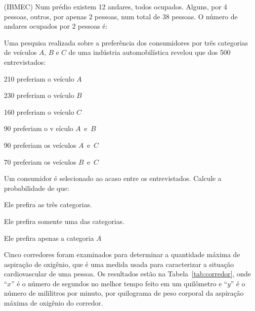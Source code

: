 \documentclass{ativmatUFRB}
\begin{document}
\begin{atividade}
\questao  (IBMEC) Num prédio existem 12 andares, todos ocupados. 
Alguns, por 4 pessoas, outros, por apenas 2 pessoas, num total de 38 pessoas. 
O número de andares ocupados por 2 pessoas é:


\questao Uma pesquisa realizada sobre a preferência dos consumidores por três 
categorias de veículos $A$, $B$ e $C$ de uma indústria automobilística revelou 
que dos 500 entrevistados:

\begin{multicols}{2}
 \begin{itens}[I)]
  \item 210 preferiam o veículo $A$
  \item 230 preferiam o veículo $B$
  \item 160 preferiam o veículo $C$
  \item 90 preferiam o v eículo $A$~e~$B$
  \item 90 preferiam os veículos $A$~e~$C$
  \item 70 preferiam os veículos $B$~e~$C$
 \end{itens}
\end{multicols}

Um consumidor é selecionado ao acaso entre os entrevistados.
Calcule a probabilidade de que:

\begin{itens}
 \item Ele prefira as três categorias.
 \item Ele prefira somente uma das categorias.
 \item Ele prefira apenas a categoria $A$
\end{itens}

\questao Cinco corredores foram examinados para determinar a quantidade máxima 
de aspiração de oxigênio, que é uma medida usada para caracterizar a situação 
cardiovascular de uma pessoa.
Os resultados estão na Tabela~\ref{tab:corredor}, onde ``$x$'' é o número de 
segundos no melhor tempo feito em um quilômetro e ``$y$'' é o número de 
mililitros por minuto, por quilograma de peso corporal da aspiração máxima de 
oxigênio do corredor.


\end{atividade}
\end{document}
